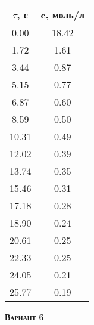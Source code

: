 \begin{table}[h]
\begin{tabular}{|c|c|}
\hline
$\tau$, с & c, моль/л \\ \hline
 0.00 &      18.42 \\ \hline 
 1.72 &       1.61 \\ \hline 
 3.44 &       0.87 \\ \hline 
 5.15 &       0.77 \\ \hline 
 6.87 &       0.60 \\ \hline 
 8.59 &       0.50 \\ \hline 
10.31 &       0.49 \\ \hline 
12.02 &       0.39 \\ \hline 
13.74 &       0.35 \\ \hline 
15.46 &       0.31 \\ \hline 
17.18 &       0.28 \\ \hline 
18.90 &       0.24 \\ \hline 
20.61 &       0.25 \\ \hline 
22.33 &       0.25 \\ \hline 
24.05 &       0.21 \\ \hline 
25.77 &       0.19 \\ \hline 
\end{tabular}
\end{table}

\newpage

\textsc{\textbf{Вариант 6}}

